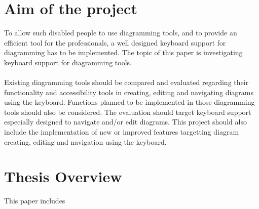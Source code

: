 \section{Aim of the project}
To allow such disabled people to use diagramming tools, and to provide an efficient tool for the professionals, a well designed keyboard support for diagramming has to be implemented.
The topic of this paper is investigating keyboard support for diagramming tools.

\paragraph{}
Existing diagramming tools should be compared and evaluated regarding their functionality and accessibility tools in creating, editing and navigating diagrams using the keyboard. Functions planned to be implemented in those diagramming tools should also be considered. The evaluation should target keyboard support especially designed to navigate and/or edit diagrams.
This project should also include the implementation of new or improved features targetting diagram creating, editing and navigation using the keyboard.

\section{Thesis Overview}
This paper includes 


